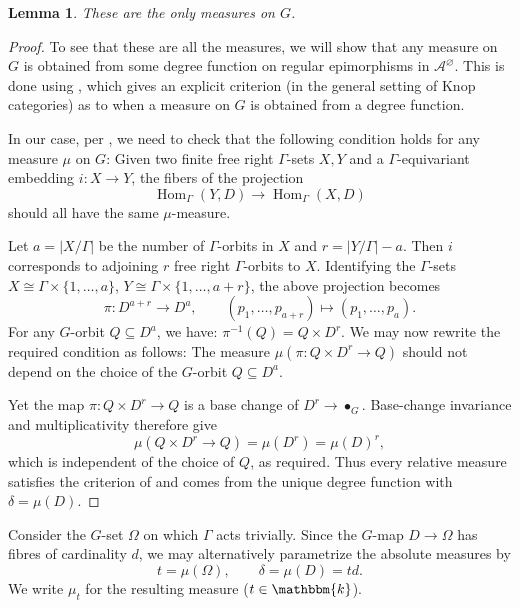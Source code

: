 \documentclass[11pt,a4paper]{amsart}
\theoremstyle{plain}%
\newtheorem{lemma}{Lemma}[subsection]
\theoremstyle{definition}
\theoremstyle{remark}
\newcommand{\Hom}{\operatorname{Hom}}
\newcommand{\kk}{\mathbbm{k}}
\begin{document}
\begin{lemma}
    These are the only measures on $G$.
\end{lemma}
\begin{proof}


     
To see that these are all the measures, we will show that any measure on $G$ is obtained from some degree function on regular epimorphisms in $\mathcal{A}^\varnothing$. This is done using \cite[Proposition~6.11 b)]{Snowden-Knop}, which gives an explicit criterion (in the general setting of Knop categories) as to when a measure on $G$ is obtained from a degree function.

In our case, per \cite[Proposition~6.11 b)]{Snowden-Knop}, we need to check that the following condition holds for any measure $\mu$ on $G$: Given two finite free right $\Gamma$-sets $X, Y$ and a $\Gamma$-equivariant embedding $i:X\to Y$, the fibers of the projection $$\Hom_\Gamma(Y, D)\to\Hom_{\Gamma}(X, D)$$ should all have the same $\mu$-measure.

Let $a=|X/\Gamma|$ be the number of $\Gamma$-orbits in $X$ and $r=|Y/\Gamma|-a$. Then $i$ corresponds to adjoining $r$ free right $\Gamma$-orbits to $X$. Identifying the $\Gamma$-sets $X\cong \Gamma\times \{1, \ldots, a\}$, $Y\cong \Gamma\times \{1, \ldots,a+r\}$, the above projection becomes
\[
  \pi:D^{a+r}\longrightarrow D^a,\qquad
  (p_1,\ldots,p_{a+r})\longmapsto(p_1,\ldots,p_a).
\]
For any $G$-orbit $Q\subseteq D^a$, we have: $\pi^{-1}(Q)=Q\times D^r$.
We may now rewrite the required condition as follows:
The measure $\mu\left(\pi:Q\times D^r\to Q\right)$ should not depend on the choice of the $G$-orbit $Q\subseteq D^a$.

Yet the map $\pi:Q\times D^r\to Q$ is a base change of
$D^r\to\bullet_G$. Base-change invariance and multiplicativity
therefore give
\[
  \mu(Q\times D^r\longrightarrow Q)=\mu(D^r)=\mu(D)^r,
\]
which is independent of the choice of $Q$, as required. 
Thus every relative measure satisfies the criterion of
\cite[Proposition~6.11]{Snowden-Knop} and comes from the unique
degree function with $\delta=\mu(D)$. 

\end{proof}
Consider the $G$-set $\Omega$ on which $\Gamma$ acts trivially. Since the $G$-map $D\to\Omega$ has
fibres of cardinality $d$, we may alternatively parametrize the
absolute measures by
\[
  t=\mu(\Omega),\qquad \delta=\mu(D)=td.
\]
We write $\mu_t$ for the resulting measure ($t\in\kk$).
\end{document}
